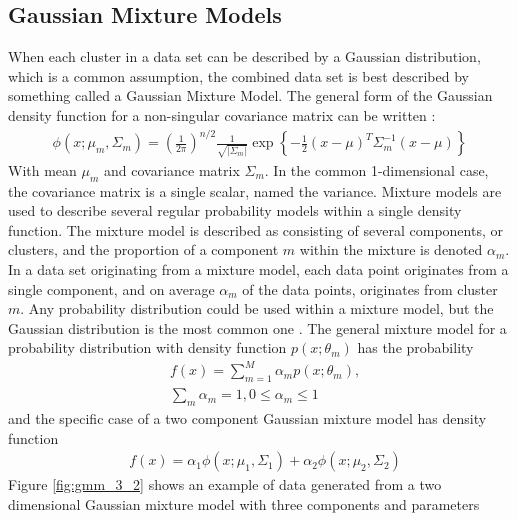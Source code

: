 \subsection{Gaussian Mixture Models}
When each cluster in a data set can be described by a Gaussian distribution, which is a common assumption, the combined data set is best described by something called a Gaussian Mixture Model. The general form of the Gaussian density function for a non-singular covariance matrix can be written \parencite{gut2009}:
\begin{align*}
  \phi(x;\mu_m,\Sigma_m) = \left(\frac{1}{2\pi}\right)^{n/2}\frac{1}{\sqrt{|\Sigma_m|}}\operatorname{exp}\left\{-\frac{1}{2}(x-\mu)^T\Sigma_m^{-1}(x-\mu)\right\}
\end{align*}
With mean $\mu_m$ and covariance matrix $\Sigma_m$. In the common 1-dimensional case, the covariance matrix is a single scalar, named the variance. Mixture models are used to describe several regular probability models within a single density function. The mixture model is described as consisting of several components, or clusters, and the proportion of a component $m$ within the mixture is denoted $\alpha_m$. In a data set originating from a mixture model, each data point originates from a single component, and on average $\alpha_m$ of the data points, originates from cluster $m$. Any probability distribution could be used within a mixture model, but the Gaussian distribution is the most common one \parencite{Alpaydin2010}. The general mixture model for a probability distribution with density function $p(x;\theta_m)$ has the probability 
\begin{align*}
    &f(x) = \sum_{m=1}^{M}\alpha_{m} p(x;\theta_{m}), \\
    &\sum_{m} \alpha_{m} = 1, 0\leq\alpha_{m}\leq 1
\end{align*}
and the specific case of a two component Gaussian mixture model has density function
\begin{align} \label{gmm_2_dens}
  &f(x) = \alpha_1\phi(x;\mu_1,\Sigma_1) + \alpha_2\phi(x;\mu_2,\Sigma_2)
\end{align}
Figure \ref{fig:gmm_3_2} shows an example of data generated from a two dimensional Gaussian mixture model with three components and parameters

